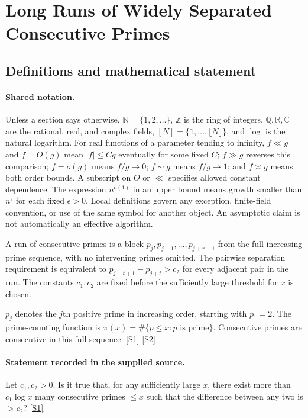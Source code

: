 \documentclass[11pt,a4paper]{article}
\newcommand{\N}{\mathbb{N}}
\newcommand{\Z}{\mathbb{Z}}
\newcommand{\Q}{\mathbb{Q}}
\newcommand{\R}{\mathbb{R}}
\newcommand{\C}{\mathbb{C}}
\newcommand{\sref}[2]{\hyperlink{source:#1:#2}{[S#2]}}
\begin{document}
\section{Long Runs of Widely Separated Consecutive Primes}\label{statement}


\subsection{Definitions and mathematical statement}

\paragraph{Shared notation.}Unless a section says otherwise, $\N=\{1,2,\ldots\}$,
$\Z$ is the ring of integers, $\Q,\R,\C$ are the rational, real, and complex
fields, $[N]=\{1,\ldots,\lfloor N\rfloor\}$, and $\log$ is the natural
logarithm. For real functions of a parameter tending to infinity,
$f\ll g$ and $f=O(g)$ mean $|f|\leq Cg$ eventually for some fixed $C$;
$f\gg g$ reverses this comparison; $f=o(g)$ means $f/g\to0$;
$f\sim g$ means $f/g\to1$; and $f\asymp g$ means both order bounds.
A subscript on $O$ or $\ll$ specifies allowed constant dependence.
The expression $n^{o(1)}$ in an upper bound means growth smaller than
$n^\epsilon$ for each fixed $\epsilon>0$. Local definitions govern any
exception, finite-field convention, or use of the same symbol for another
object. An asymptotic claim is not automatically an effective algorithm.



A run of consecutive primes is a block $p_j,p_{j+1},\ldots,p_{j+r-1}$ from the full increasing prime sequence, with no intervening primes omitted. The pairwise separation requirement is equivalent to $p_{j+t+1}-p_{j+t}>c_2$ for every adjacent pair in the run. The constants $c_1,c_2$ are fixed before the sufficiently large threshold for $x$ is chosen.

$p_j$ denotes the $j$th positive prime in increasing order, starting with $p_1=2$. The prime-counting function is $\pi(x)=\#\{p\leq x:p\text{ is prime}\}$. Consecutive primes are consecutive in this full sequence. \sref{statement}{1} \sref{statement}{2}

\paragraph{Statement recorded in the supplied source.}
Let $c_1,c_2>0$. Is it true that, for any sufficiently large $x$, there exist more than $c_1\log x$ many consecutive primes $\leq x$ such that the difference between any two is $>c_2$? \sref{statement}{1}
\end{document}
